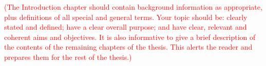 \textcolor{red}{(The Introduction chapter should contain background information as appropriate, plus definitions of all special and general terms. Your topic should be: clearly stated and defined; have a clear overall purpose; and have clear, relevant and coherent aims and objectives. It is also informative to give a brief description of the contents of the remaining chapters of the thesis. This alerts the reader and prepares them for the rest of the thesis.)}


